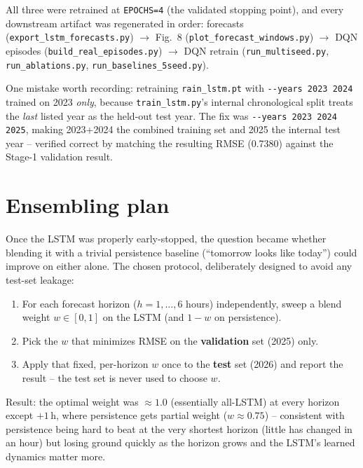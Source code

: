 \documentclass[11pt]{article}
\begin{document}
All three were retrained at \texttt{EPOCHS=4} (the validated stopping point), and every
downstream artifact was regenerated in order: forecasts
(\texttt{export\_lstm\_forecasts.py}) $\to$ Fig.~8 (\texttt{plot\_forecast\_windows.py})
$\to$ DQN episodes (\texttt{build\_real\_episodes.py}) $\to$ DQN retrain
(\texttt{run\_multiseed.py}, \texttt{run\_ablations.py}, \texttt{run\_baselines\_5seed.py}).

One mistake worth recording: retraining \texttt{rain\_lstm.pt} with
\texttt{-{}-years 2023 2024} trained on 2023 \emph{only}, because
\texttt{train\_lstm.py}'s internal chronological split treats the \emph{last} listed
year as the held-out test year. The fix was \texttt{-{}-years 2023 2024 2025}, making
2023+2024 the combined training set and 2025 the internal test year -- verified correct
by matching the resulting RMSE (0.7380) against the Stage-1 validation result.

\section{Ensembling plan}
Once the LSTM was properly early-stopped, the question became whether blending it with
a trivial persistence baseline (``tomorrow looks like today'') could improve on either
alone. The chosen protocol, deliberately designed to avoid any test-set leakage:

\begin{enumerate}
  \item For each forecast horizon ($h=1,\dots,6$ hours) independently, sweep a blend
  weight $w\in[0,1]$ on the LSTM (and $1-w$ on persistence).
  \item Pick the $w$ that minimizes RMSE on the \textbf{validation} set (2025) only.
  \item Apply that fixed, per-horizon $w$ once to the \textbf{test} set (2026) and report
  the result -- the test set is never used to choose $w$.
\end{enumerate}

Result: the optimal weight was $\approx1.0$ (essentially all-LSTM) at every horizon
except $+1$\,h, where persistence gets partial weight ($w\approx0.75$) -- consistent with
persistence being hard to beat at the very shortest horizon (little has changed in an
hour) but losing ground quickly as the horizon grows and the LSTM's learned dynamics
matter more.
\end{document}
